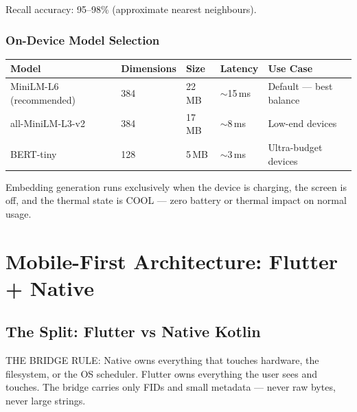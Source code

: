 Recall accuracy: 95--98\% (approximate nearest neighbours).

\subsection{On-Device Model Selection}

\begin{longtable}{@{}p{44mm}p{22mm}p{18mm}p{18mm}p{38mm}@{}}
\toprule
\textbf{Model} & \textbf{Dimensions} & \textbf{Size} & \textbf{Latency} & \textbf{Use Case} \\
\midrule
MiniLM-L6 (recommended) & 384 & 22\,MB & $\sim$15\,ms & Default --- best balance \\
all-MiniLM-L3-v2 & 384 & 17\,MB & $\sim$8\,ms & Low-end devices \\
BERT-tiny & 128 & 5\,MB & $\sim$3\,ms & Ultra-budget devices \\
\bottomrule
\end{longtable}

Embedding generation runs exclusively when the device is charging, the screen is off, and the thermal state is COOL --- zero battery or thermal impact on normal usage.

\chapter{Mobile-First Architecture: Flutter + Native}

\section{The Split: Flutter vs Native Kotlin}

\begin{lawbox}
THE BRIDGE RULE: Native owns everything that touches hardware, the filesystem, or the OS scheduler. Flutter owns everything the user sees and touches. The bridge carries only FIDs and small metadata --- never raw bytes, never large strings.
\end{lawbox}


